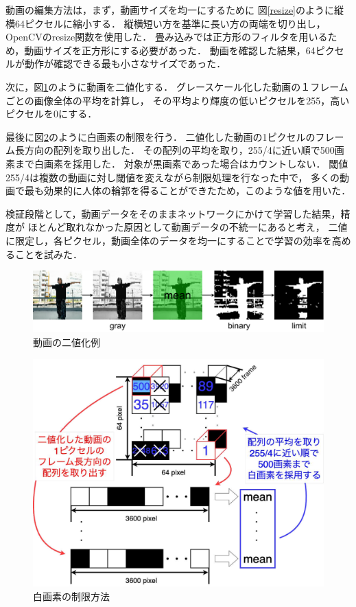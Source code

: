 動画の編集方法は，まず，動画サイズを均一にするために
図\ref{resize}のように縦横64ピクセルに縮小する．
縦横短い方を基準に長い方の両端を切り出し，OpenCVのresize関数\cite{resize}を使用した．
畳み込みでは正方形のフィルタを用いるため，動画サイズを正方形にする必要があった．
動画を確認した結果，64ピクセルが動作が確認できる最も小さなサイズであった．

次に，図\ref{binary}のように動画を二値化する．
グレースケール化した動画の１フレームごとの画像全体の平均を計算し，
その平均より輝度の低いピクセルを255，高いピクセルを0にする．

最後に図\ref{choice}のように白画素の制限を行う．
二値化した動画の1ピクセルのフレーム長方向の配列を取り出した．
その配列の平均を取り，255/4に近い順で500画素まで白画素を採用した．
対象が黒画素であった場合はカウントしない．
閾値255/4は複数の動画に対し閾値を変えながら制限処理を行なった中で，
多くの動画で最も効果的に人体の輪郭を得ることができたため，このような値を用いた．

検証段階として，動画データをそのままネットワークにかけて学習した結果，精度が
ほとんど取れなかった原因として動画データの不統一にあると考え，
二値に限定し，各ピクセル，動画全体のデータを均一にすることで学習の効率を高めることを試みた．

\begin{figure}[b]
  \begin{center}
    \includegraphics[width=120mm]{images/chart/binary.pdf}
  \end{center}
  \caption{動画の二値化例}
  \label{binary}
\end{figure}
\clearpage

\begin{figure}[t]
  \begin{center}
    \includegraphics[width=120mm]{images/chart/choice.pdf}
  \end{center}
  \caption{白画素の制限方法}
  \label{choice}
\end{figure}

